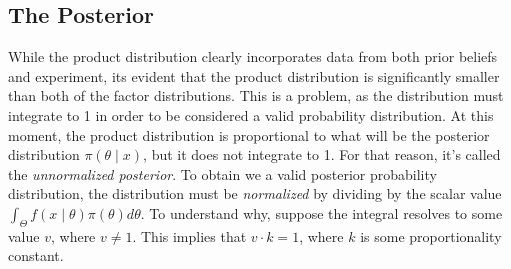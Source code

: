 \documentclass[12pt]{article}
\begin{document}
\subsection*{The Posterior}
\noindent While the product distribution clearly incorporates data from both prior beliefs and experiment, its evident that the product distribution is significantly smaller than both of the factor distributions. This is a problem, as the distribution must integrate to 1 in order to be considered a valid probability distribution. At this moment, the product distribution is proportional to what will be the posterior distribution $\pi(\theta \mid x)$, but it does not integrate to 1. For that reason, it's called the \textit{unnormalized posterior}. To obtain we a valid posterior probability distribution, the distribution must be \textit{normalized} by dividing by the scalar value $\int_{\Theta} f(x \mid \theta) \pi(\theta) d\theta$. To understand why, suppose the integral resolves to some value $v$, where $v \neq 1$. This implies that $v \cdot k = 1$, where $k$ is some proportionality constant.
\end{document}
